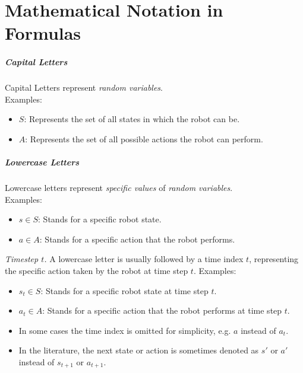 \chapter*{Mathematical Notation in Formulas}

\paragraph{Capital Letters} 
Capital Letters represent \textit{random variables}. \\
Examples:
\begin{itemize}
  \item $S$: Represents the set of all states in which the robot can be.
  \item $A$: Represents the set of all possible actions the robot can perform.
\end{itemize}

\paragraph{Lowercase Letters} 
Lowercase letters represent \textit{specific values} of \textit{random variables}. \\
Examples: 
\begin{itemize}
  \item $s \in S$: Stands for a specific robot state.
  \item $a \in A$: Stands for a specific action that the robot performs.
\end{itemize}

\textit{Timestep $t$.} A lowercase letter is usually followed by a time index $t$, representing the specific action taken by the robot at time step $t$. 
Examples:
\begin{itemize}
    \item $s_t \in S$: Stands for a specific robot state at time step $t$.
    \item $a_t \in A$: Stands for a specific action that the robot performs at time step $t$.
    \item In some cases the time index is omitted for simplicity, e.g. $a$ instead of $a_t$.
    \item In the literature, the next state or action is sometimes denoted as $s'$ or $a'$ instead of $s_{t+1}$ or $a_{t+1}$.
\end{itemize}

